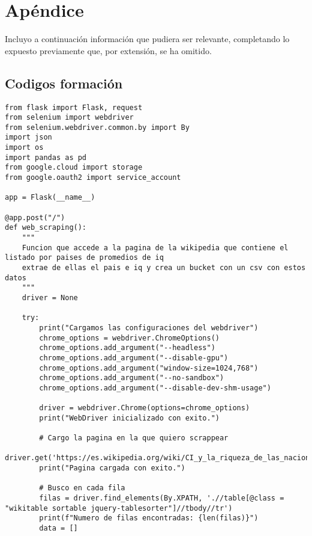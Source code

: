 \chapter*{Apéndice}
Incluyo a continuación información que pudiera ser relevante, completando lo expuesto previamente que, por extensión, se ha omitido.
%
%
%
\section{Codigos formación}
\begin{lstlisting}[caption = {Código de web scrapping completo.}, label = WBSCode]
from flask import Flask, request
from selenium import webdriver
from selenium.webdriver.common.by import By
import json
import os
import pandas as pd
from google.cloud import storage
from google.oauth2 import service_account

app = Flask(__name__)

@app.post("/")
def web_scraping():
    """
    Funcion que accede a la pagina de la wikipedia que contiene el listado por paises de promedios de iq
    extrae de ellas el pais e iq y crea un bucket con un csv con estos datos
    """
    driver = None

    try:
        print("Cargamos las configuraciones del webdriver")
        chrome_options = webdriver.ChromeOptions()
        chrome_options.add_argument("--headless")
        chrome_options.add_argument("--disable-gpu")
        chrome_options.add_argument("window-size=1024,768")
        chrome_options.add_argument("--no-sandbox")
        chrome_options.add_argument("--disable-dev-shm-usage") 

        driver = webdriver.Chrome(options=chrome_options)
        print("WebDriver inicializado con exito.")

        # Cargo la pagina en la que quiero scrappear
        driver.get('https://es.wikipedia.org/wiki/CI_y_la_riqueza_de_las_naciones')
        print("Pagina cargada con exito.")
        
        # Busco en cada fila
        filas = driver.find_elements(By.XPATH, './/table[@class = "wikitable sortable jquery-tablesorter"]//tbody//tr')
        print(f"Numero de filas encontradas: {len(filas)}")
        data = []
        

\end{lstlisting}
